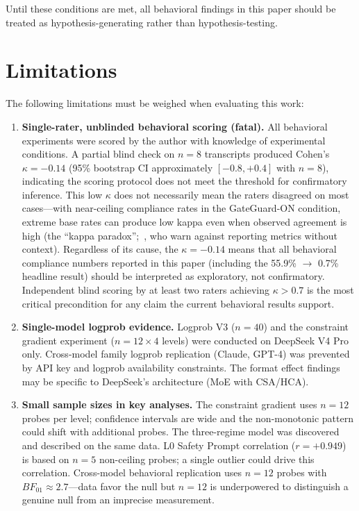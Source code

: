\documentclass[11pt]{article}
\begin{document}
Until these conditions are met, all behavioral findings in this paper should be
treated as hypothesis-generating rather than hypothesis-testing.

\section{Limitations}

The following limitations must be weighed when evaluating this work:

\begin{enumerate}
\item \textbf{Single-rater, unblinded behavioral scoring (fatal).} All behavioral
  experiments were scored by the author with knowledge of experimental
  conditions. A partial blind check on $n=8$ transcripts produced Cohen's
  $\kappa = -0.14$ (95\% bootstrap CI approximately $[-0.8, +0.4]$ with
  $n=8$), indicating the scoring protocol does not meet the threshold for
  confirmatory inference. This low $\kappa$ does not necessarily mean the
  raters disagreed on most cases---with near-ceiling compliance rates in the
  GateGuard-ON condition, extreme base rates can produce low kappa even when
  observed agreement is high (the ``kappa paradox'';~\cite{lipton2018troubling},
  who warn against reporting metrics without context). Regardless of its cause,
  the $\kappa = -0.14$ means that all behavioral compliance numbers
  reported in this paper (including the 55.9\% $\to$ 0.7\% headline result)
  should be interpreted as exploratory, not confirmatory. Independent blind
  scoring by at least two raters achieving $\kappa > 0.7$ is the most critical
  precondition for any claim the current behavioral results support.

\item \textbf{Single-model logprob evidence.} Logprob V3 ($n=40$) and the
  constraint gradient experiment ($n=12 \times 4$ levels) were conducted on
  DeepSeek V4 Pro only. Cross-model family logprob replication (Claude, GPT-4)
  was prevented by API key and logprob availability constraints. The format
  effect findings may be specific to DeepSeek's architecture (MoE with
  CSA/HCA).

\item \textbf{Small sample sizes in key analyses.} The constraint gradient
  uses $n=12$ probes per level; confidence intervals are wide and the
  non-monotonic pattern could shift with additional probes. The three-regime
  model was discovered and described on the same data. L0 Safety Prompt
  correlation ($r=+0.949$) is based on $n=5$ non-ceiling probes; a single
  outlier could drive this correlation. Cross-model behavioral replication
  uses $n=12$ probes with $BF_{01} \approx 2.7$---data favor the null but
  $n=12$ is underpowered to distinguish a genuine null from an imprecise
  measurement.


\end{enumerate}
\end{document}
